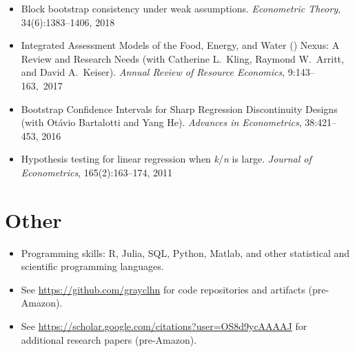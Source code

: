 \documentclass[10pt]{safecv}%
\begin{document}
\begin{itemize}[noitemsep]
\item Block bootstrap consistency under weak assumptions.
  \textit{Econometric Theory}, 34(6):1383--1406, 2018
\item Integrated Assessment Models of the Food, Energy, and Water
  () Nexus: A Review and Research Needs (with Catherine
  L.\ Kling, Raymond W.\ Arritt, and David A.\ Keiser). \textit{Annual
    Review of Resource Economics}, \mbox{9:143--163, 2017}
\item Bootstrap Confidence Intervals for Sharp Regression
  Discontinuity Designs (with Ot\'avio Bartalotti and Yang
  He). \textit{Advances in Econometrics}, 38:421--453, 2016
\item Hypothesis testing for linear regression when
  \textit{k}/\textit{n} is large. \textit{Journal of Econometrics},
  165(2):163--174, 2011
\end{itemize}

\section*{Other}

\begin{itemize}[noitemsep]
\item Programming skills: R, Julia, SQL, Python, Matlab, and other statistical and scientific
  programming languages.
\item See \url{https://github.com/grayclhn} for code repositories and artifacts (pre-Amazon).
\item See \url{https://scholar.google.com/citations?user=OS8d9ycAAAAJ} for additional research papers (pre-Amazon).
\end{itemize}
\end{document}
